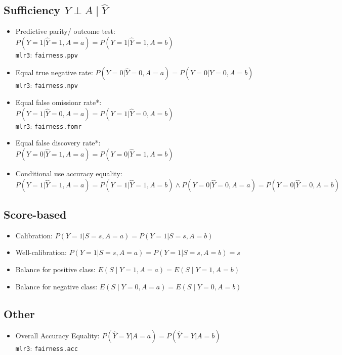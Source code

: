 \documentclass[11pt,a4paper]{article}
\begin{document}
\subsection*{Sufficiency $Y \perp A \mid \hat{Y}$}
\begin{itemize}[leftmargin=2em]
    \item Predictive parity/ outcome test: $P(Y = 1 | \hat{Y} = 1, A = a) = P(Y = 1 | \hat{Y} = 1, A = b)$ \\ \texttt{mlr3}: \texttt{fairness.ppv}
    \item Equal true negative rate: $P(Y = 0 | \hat{Y} = 0, A = a) = P(Y = 0 | \hat{Y} = 0, A = b)$ \\ \texttt{mlr3}: \texttt{fairness.npv}
    \item Equal false omissionr rate*: $P(Y = 1 | \hat{Y} = 0, A = a) = P(Y = 1 | \hat{Y} = 0, A = b)$ \\ \texttt{mlr3}: \texttt{fairness.fomr}
    \item Equal false discovery rate*: $P(Y = 0 | \hat{Y} = 1, A = a) = P(Y = 0 | \hat{Y} = 1, A = b)$ 
    \item Conditional use accuracy equality: $P(Y = 1 | \hat{Y} = 1, A = a) = P(Y = 1 | \hat{Y} = 1, A = b) \land P(Y = 0 | \hat{Y} = 0, A = a) = P(Y = 0 | \hat{Y} = 0, A = b)$
\end{itemize}

\subsection*{Score-based}
\begin{itemize}
    \item Calibration: $P(Y = 1 | S = s, A = a) = P(Y = 1 | S = s, A = b)$
    \item Well-calibration: $P(Y = 1 | S = s, A = a) = P(Y = 1 | S = s, A = b) = s$
    \item Balance for positive class: $E(S \mid Y = 1, A = a) = E(S \mid Y = 1, A = b)$
    \item Balance for negative class: $E(S \mid Y = 0, A = a) = E(S \mid Y = 0, A = b)$
\end{itemize}
\subsection*{Other}
\begin{itemize}
    \item Overall Accuracy Equality: $P(\hat{Y} = Y | A = a) = P(\hat{Y} = Y | A = b)$ \\ \texttt{mlr3}: \texttt{fairness.acc}
\end{itemize}
\end{document}
